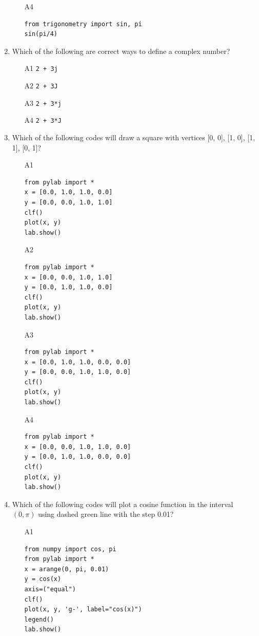 \begin{enumerate}
\begin{enumerate}
\item[A4] 
\begin{verbatim}
from trigonometry import sin, pi
sin(pi/4)
\end{verbatim}
\end{enumerate}
\item Which of the following are correct ways to define a complex number?
\begin{enumerate}
\item[A1] {\tt 2 + 3j}
\item[A2] {\tt 2 + 3J}
\item[A3] {\tt 2 + 3*j}
\item[A4] {\tt 2 + 3*J}
\end{enumerate}
\item Which of the following codes will draw a square with vertices [0, 0], [1, 0], [1, 1], [0, 1]?
\begin{enumerate}
\item[A1] 
\begin{verbatim}
from pylab import *
x = [0.0, 1.0, 1.0, 0.0]
y = [0.0, 0.0, 1.0, 1.0]
clf()
plot(x, y)
lab.show()
\end{verbatim}
\item[A2] 
\begin{verbatim}
from pylab import *
x = [0.0, 0.0, 1.0, 1.0]
y = [0.0, 1.0, 1.0, 0.0]
clf()
plot(x, y)
lab.show()
\end{verbatim}
\item[A3] 
\begin{verbatim}
from pylab import *
x = [0.0, 1.0, 1.0, 0.0, 0.0]
y = [0.0, 0.0, 1.0, 1.0, 0.0]
clf()
plot(x, y)
lab.show()
\end{verbatim}
\item[A4] 
\begin{verbatim}
from pylab import *
x = [0.0, 0.0, 1.0, 1.0, 0.0]
y = [0.0, 1.0, 1.0, 0.0, 0.0]
clf()
plot(x, y)
lab.show()
\end{verbatim}
\end{enumerate}
\item Which of the following codes will plot a cosine function in the interval $(0, \pi)$ using dashed green line with
the step 0.01?
\begin{enumerate}
\item[A1] 
\begin{verbatim}
from numpy import cos, pi
from pylab import *
x = arange(0, pi, 0.01)
y = cos(x)
axis=("equal")
clf()
plot(x, y, 'g-', label="cos(x)")
legend()
lab.show()
\end{verbatim}

\end{enumerate}
\end{enumerate}
